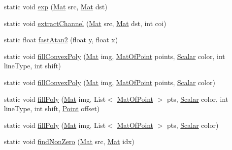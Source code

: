 \begin{DoxyCompactItemize}
\item 
static void \mbox{\hyperlink{classorg_1_1opencv_1_1core_1_1_core_a18688b13789043dfaa98161fe663f075}{exp}} (\mbox{\hyperlink{classorg_1_1opencv_1_1core_1_1_mat}{Mat}} src, \mbox{\hyperlink{classorg_1_1opencv_1_1core_1_1_mat}{Mat}} dst)
\item 
static void \mbox{\hyperlink{classorg_1_1opencv_1_1core_1_1_core_aed121d8dfc230918f9086b7ba06c0b57}{extract\+Channel}} (\mbox{\hyperlink{classorg_1_1opencv_1_1core_1_1_mat}{Mat}} src, \mbox{\hyperlink{classorg_1_1opencv_1_1core_1_1_mat}{Mat}} dst, int coi)
\item 
static float \mbox{\hyperlink{classorg_1_1opencv_1_1core_1_1_core_aeb2a09f9bb80c8c33e4b5074078d892c}{fast\+Atan2}} (float y, float x)
\item 
static void \mbox{\hyperlink{classorg_1_1opencv_1_1core_1_1_core_ad5886a0bea843f9e8b5d6680309b53a7}{fill\+Convex\+Poly}} (\mbox{\hyperlink{classorg_1_1opencv_1_1core_1_1_mat}{Mat}} img, \mbox{\hyperlink{classorg_1_1opencv_1_1core_1_1_mat_of_point}{Mat\+Of\+Point}} points, \mbox{\hyperlink{classorg_1_1opencv_1_1core_1_1_scalar}{Scalar}} color, int line\+Type, int shift)
\item 
static void \mbox{\hyperlink{classorg_1_1opencv_1_1core_1_1_core_af384d6fce35de3e8e9dbed55b13e51a6}{fill\+Convex\+Poly}} (\mbox{\hyperlink{classorg_1_1opencv_1_1core_1_1_mat}{Mat}} img, \mbox{\hyperlink{classorg_1_1opencv_1_1core_1_1_mat_of_point}{Mat\+Of\+Point}} points, \mbox{\hyperlink{classorg_1_1opencv_1_1core_1_1_scalar}{Scalar}} color)
\item 
static void \mbox{\hyperlink{classorg_1_1opencv_1_1core_1_1_core_ad8378847b326f2e9edfba5c6ad68a171}{fill\+Poly}} (\mbox{\hyperlink{classorg_1_1opencv_1_1core_1_1_mat}{Mat}} img, List$<$ \mbox{\hyperlink{classorg_1_1opencv_1_1core_1_1_mat_of_point}{Mat\+Of\+Point}} $>$ pts, \mbox{\hyperlink{classorg_1_1opencv_1_1core_1_1_scalar}{Scalar}} color, int line\+Type, int shift, \mbox{\hyperlink{classorg_1_1opencv_1_1core_1_1_point}{Point}} offset)
\item 
static void \mbox{\hyperlink{classorg_1_1opencv_1_1core_1_1_core_a315055271ede64d63610b0f03b31026b}{fill\+Poly}} (\mbox{\hyperlink{classorg_1_1opencv_1_1core_1_1_mat}{Mat}} img, List$<$ \mbox{\hyperlink{classorg_1_1opencv_1_1core_1_1_mat_of_point}{Mat\+Of\+Point}} $>$ pts, \mbox{\hyperlink{classorg_1_1opencv_1_1core_1_1_scalar}{Scalar}} color)
\item 
static void \mbox{\hyperlink{classorg_1_1opencv_1_1core_1_1_core_a386b6ad3e80eca8a6afa48a2e5423140}{find\+Non\+Zero}} (\mbox{\hyperlink{classorg_1_1opencv_1_1core_1_1_mat}{Mat}} src, \mbox{\hyperlink{classorg_1_1opencv_1_1core_1_1_mat}{Mat}} idx)

\end{DoxyCompactItemize}
